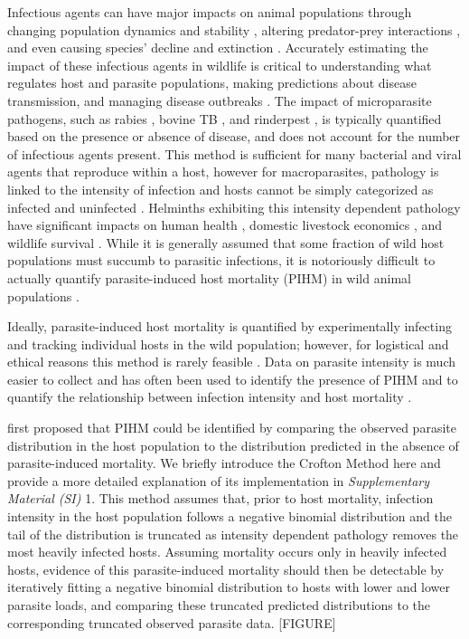 \documentclass[12pt, a4paper]{article}
\begin{document}
Infectious agents can have major impacts on animal populations through changing
population dynamics and stability \citep{Dobson1992}, altering predator-prey interactions \citep{Joly2004}, and
even causing species' decline and extinction \citep{DeCastro2005a,McCallum2012b}. Accurately estimating the impact
of these infectious agents in wildlife is critical to understanding what
regulates host and parasite populations, making predictions about disease
transmission, and managing disease outbreaks \citep{Langwig2015}. The impact of microparasite pathogens, such as rabies \citep{Coyne1989}, bovine TB \citep{Cox2005}, and
rinderpest \citep{Tille1991}, is typically quantified based on the presence or absence of
disease, and does not account for the number of infectious agents present.
This method is sufficient for many bacterial and viral agents that reproduce within a
host, however for macroparasites, pathology is linked to the intensity of infection and hosts cannot be simply categorized as infected and
uninfected \citep{AndersonandMay1979,Lafferty2002}.  Helminths exhibiting this intensity dependent pathology have
significant impacts on human health \citep{Brooker2004}, domestic livestock economics \citep{Roeber2013}, and
wildlife survival \citep{Kirk2003, Logiudice2003}.  While it is generally assumed that some fraction of
wild host populations must succumb to parasitic infections, it is notoriously
difficult to actually quantify parasite-induced host mortality (PIHM) in wild
animal populations \citep{McCallum2000a}.

Ideally, parasite-induced host mortality is
quantified by experimentally infecting and tracking individual hosts in the
wild population; however, for logistical and ethical reasons this method is
rarely feasible \citep{McCallum2000a}. Data on parasite intensity is much easier to collect and has
often been used to identify the presence of PIHM \citep{Crofton1971a,Lester1977,Lester1984,Lanciani1989,Royce1990,Ferguson2011} and to quantify the
relationship between infection intensity and host mortality \citep{Adjei1986}.

\cite{Crofton1971a} first proposed that PIHM could be identified by comparing the
observed parasite distribution in the host population to the distribution
predicted in the absence of parasite-induced mortality. We briefly introduce the Crofton Method here and provide a more detailed explanation of its implementation in \emph{Supplementary Material (SI)} 1. This method
assumes that, prior to host mortality, infection intensity in the host population follows a negative binomial distribution and the tail of the distribution is truncated as intensity dependent pathology removes the most heavily infected hosts. Assuming mortality occurs only in heavily infected hosts, evidence of this parasite-induced mortality should then be detectable by iteratively
fitting a negative binomial distribution to hosts with lower and lower parasite
loads, and comparing these truncated predicted distributions to the corresponding truncated observed parasite data. [FIGURE]
\end{document}
